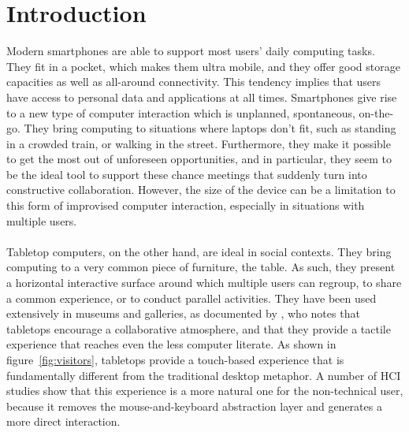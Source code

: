 

%

\chapter{Introduction}
\label{introduction}

Modern smartphones are able to support most users' daily computing tasks.
They fit in a pocket, which makes them ultra mobile, and they offer good storage capacities as well as all-around connectivity.
This tendency implies that users have access to personal data and applications at all times.
Smartphones give rise to a new type of computer interaction which is unplanned, spontaneous, on-the-go.
They bring computing to situations where laptops don't fit, such as standing in a crowded train, or walking in the street.
Furthermore, they make it possible to get the most out of unforeseen opportunities, and in particular, they seem to be the ideal tool to support these chance meetings that suddenly turn into constructive collaboration.
However, the size of the device can be a limitation to this form of improvised computer interaction, especially in situations with multiple users. 
\\\\
Tabletop computers, on the other hand, are ideal in social contexts.
They bring computing to a very common piece of furniture, the table.
As such, they present a horizontal interactive surface around which multiple users can regroup, to share a common experience, or to conduct parallel activities.
They have been used extensively in museums and galleries, as documented by \cite{Geller:2006:exhibits}, who notes that tabletops encourage a collaborative atmosphere, and that they provide a tactile experience that reaches even the less computer literate.
As shown in figure~\ref{fig:visitors}, tabletops provide a touch-based experience that is fundamentally different from the traditional desktop metaphor.
A number of HCI studies show that this experience is a more natural one for the non-technical user, because it removes the mouse-and-keyboard abstraction layer and generates a more direct interaction.

